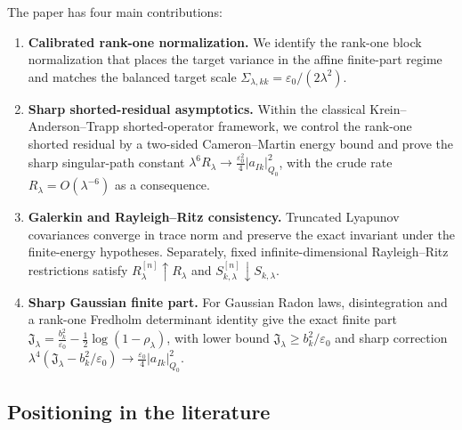 \documentclass[preprint,12pt]{elsarticle}
\theoremstyle{plain}
\theoremstyle{definition}
\theoremstyle{remark}
\begin{document}
    The paper has four main contributions:
    \begin{enumerate}
        \item \textbf{Calibrated rank-one normalization.} We identify the
        rank-one block normalization that places the target variance in the
        affine finite-part regime and matches the balanced target scale
        $\Sigma_{\lambda,kk}=\varepsilon_0/(2\lambda^2)$.
        \item \textbf{Sharp shorted-residual asymptotics.} Within the classical
        Krein--Anderson--Trapp shorted-operator framework, we control the
        rank-one shorted residual by a two-sided Cameron--Martin energy bound and
        prove the sharp singular-path constant
        $\lambda^6R_\lambda\to\frac{\varepsilon_0^2}{4}|a_{Ik}|_{Q_0}^2$, with the
        crude rate $R_\lambda=O(\lambda^{-6})$ as a consequence.
        \item \textbf{Galerkin and Rayleigh--Ritz consistency.} Truncated
        Lyapunov covariances converge in trace norm and preserve the exact
        invariant under the finite-energy hypotheses.  Separately, fixed
        infinite-dimensional Rayleigh--Ritz restrictions satisfy
        $R_\lambda^{[n]}\uparrow R_\lambda$ and
        $S_{k,\lambda}^{[n]}\downarrow S_{k,\lambda}$.
        \item \textbf{Sharp Gaussian finite part.} For Gaussian Radon laws,
        disintegration and a rank-one Fredholm determinant identity give the
        exact finite part
        $\mathfrak{J}_\lambda=\frac{b_k^2}{\varepsilon_0}-\frac12\log(1-\rho_\lambda)$,
        with lower bound $\mathfrak{J}_\lambda\ge b_k^2/\varepsilon_0$ and sharp
        correction
        $\lambda^4(\mathfrak{J}_\lambda-b_k^2/\varepsilon_0)\to\frac{\varepsilon_0}{4}|a_{Ik}|_{Q_0}^2$.
    \end{enumerate}

    \subsection{Positioning in the literature}
    \label{sec:related}
\end{document}

